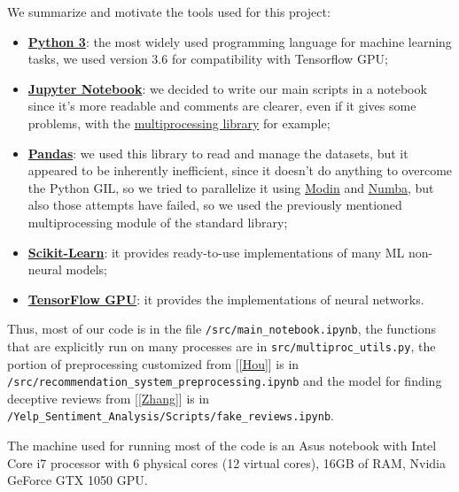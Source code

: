 We summarize and motivate the tools used for this project:
\begin{itemize}
	\item \textbf{\href{https://www.python.org/}{Python 3}}: the most widely used programming language for machine learning tasks, we used version 3.6 for compatibility with Tensorflow GPU;
	\item \textbf{\href{https://jupyter.org/}{Jupyter Notebook}}: we decided to write our main scripts in a notebook since it's more readable and comments are clearer, even if it gives some problems, with the \href{https://docs.python.org/3.6/library/multiprocessing.html}{multiprocessing library} for example;
	\item \textbf{\href{http://pandas.pydata.org}{Pandas}}: we used this library to read and manage the datasets, but it appeared to be inherently inefficient, since it doesn't do anything to overcome the Python GIL, so we tried to parallelize it using \href{https://modin.readthedocs.io/en/latest/index.html}{Modin} and \href{https://numba.pydata.org/}{Numba}, but also those attempts have failed, so we used the previously mentioned multiprocessing module of the standard library;
	\item \textbf{\href{http://scikit-learn.org}{Scikit-Learn}}: it provides ready-to-use implementations of many ML non-neural models;
	\item \textbf{\href{https://www.tensorflow.org/}{TensorFlow GPU}}: it provides the implementations of neural networks.
\end{itemize}

Thus, most of our code is in the file \texttt{/src/main\_notebook.ipynb}, the functions that are explicitly run on many processes are in \texttt{src/multiproc\_utils.py}, the portion of preprocessing customized from [\ref{Hou}] is in \texttt{/src/recommendation\_system\_preprocessing.ipynb} and the model for finding deceptive reviews from [\ref{Zhang}] is in \texttt{/Yelp\_Sentiment\_Analysis/Scripts/fake\_reviews.ipynb}.

The machine used for running most of the code is an Asus notebook with Intel Core i7 processor with 6 physical cores (12 virtual cores), 16GB of RAM, Nvidia GeForce GTX 1050 GPU.
